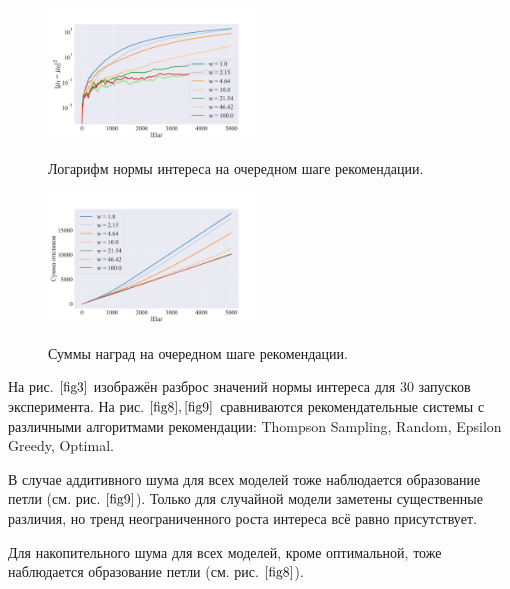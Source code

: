 \documentclass[12pt, twoside]{article}
\begin{document}
\begin{figure}[h]
  \begin{multicols}{2}
    \hfill
    \includegraphics[width=0.5\textwidth]{../figures/norm_interest.pdf}
    \hfill
    \caption{Логарифм нормы интереса на очередном шаге рекомендации.}
    \label{fig1}
    \hfill
    \includegraphics[width=0.5\textwidth]{../figures/rewards.pdf}
    \hfill
    \caption{Суммы наград на очередном шаге рекомендации.}
    \label{fig2}
  \end{multicols}
\end{figure}

На рис.$~\ref{fig3}$ изображён разброс значений нормы интереса для 30 запусков эксперимента.
На рис.$~\ref{fig8},\ref{fig9}$ сравниваются рекомендательные системы с различными алгоритмами рекомендации: Thompson Sampling, Random, Epsilon Greedy, Optimal.

В случае аддитивного шума для всех моделей тоже наблюдается образование петли (см. рис.$~\ref{fig9}$). 
Только для случайной модели заметены существенные различия, но тренд неограниченного роста интереса всё равно присутствует.   


Для накопительного шума для всех моделей, кроме оптимальной, тоже наблюдается образование петли (см. рис.$~\ref{fig8}$). 
\end{document}
